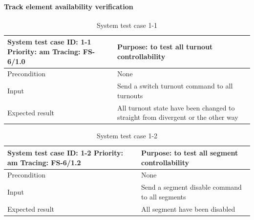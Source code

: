 \paragraph{Track element availability verification}
\begin{table}[H]
	\caption{System test case 1-1}
	\label{table:TCase-FSS1-1}
	\begin{center}
		\renewcommand{\arraystretch}{1.8}
		\begin{tabu} 
			to 0.9 \textwidth
			{  X[0.4, c] X[c] }
			\toprule
			System test case ID: 1-1 \newline Priority: am \newline Tracing: FS-6/1.0 & Purpose: to test all turnout controllability                                    \\ \midrule
			Precondition                                                              & None                                                                            \\
			Input                                                                     & Send a switch turnout command to all turnouts                                   \\
			Expected result                                                           & All turnout state have been changed to straight from divergent or the other way \\ \bottomrule
		\end{tabu}
	\end{center}
\end{table}

\begin{table}[H]
	\caption{System test case 1-2}
	\label{table:TCase-FSS1-2}
	\begin{center}
		\renewcommand{\arraystretch}{1.8}
		\begin{tabu} 
			to 0.9 \textwidth
			{  X[0.4, c] X[c] }
			\toprule
			System test case ID: 1-2 \newline Priority: am \newline Tracing: FS-6/1.2 & Purpose: to test all segment controllability   \\ \midrule
			Precondition                                                              & None                                           \\
			Input                                                                     & Send a segment disable command to all segments \\
			Expected result                                                           & All segment have been disabled                 \\ \bottomrule
		\end{tabu}
	\end{center}
\end{table}

